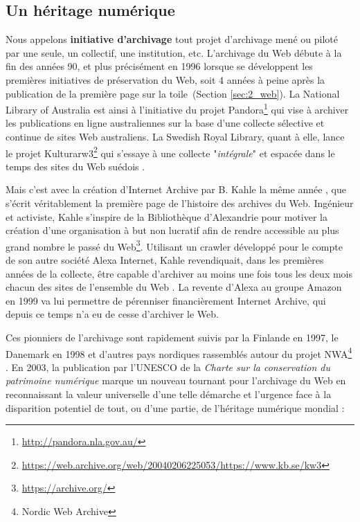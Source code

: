 \documentclass[symmetric,justified,marginals=raggedouter]{tufte-book}
\begin{document}
\subsection{Un héritage numérique}

\noindent Nous appelons \textbf{initiative d'archivage} tout projet d'archivage mené ou piloté par une seule, un collectif, une institution, etc. L'archivage du Web débute à la fin des années 90, et plus précisément en 1996 lorsque se développent les premières initiatives de préservation du Web, soit 4 années à peine après la publication de la première page sur la toile~(Section \ref{sec:2_web}). La National Library of Australia est ainsi à l'initiative du projet Pandora\footnote{\url{http://pandora.nla.gov.au/}} qui vise à archiver les publications en ligne australiennes sur la base d'une collecte sélective et continue de sites Web australiens. La Swedish Royal Library, quant à elle, lance le projet Kulturarw3\footnote{\url{https://web.archive.org/web/20040206225053/https://www.kb.se/kw3}} qui s'essaye à une collecte "\textit{intégrale}" et espacée dans le temps des sites du Web suédois \citep{arvidson_kulturarw3_2000}.

Mais c'est avec la création d'Internet Archive par B. Kahle la même année \citep{kahle_preserving_1997}, que s'écrit véritablement la première page de l'histoire des archives du Web. Ingénieur et activiste, Kahle s'inspire de la Bibliothèque d'Alexandrie pour motiver la création d'une organisation à but non lucratif afin de rendre accessible au plus grand nombre le passé du Web\footnote{\url{https://archive.org/}}. Utilisant un crawler développé pour le compte de son autre société Alexa Internet, Kahle revendiquait, dans les premières années de la collecte, être capable d'archiver au moins une fois tous les deux mois chacun des sites de l'ensemble du Web \citep{mohr_introduction_2004}. La revente d'Alexa au groupe Amazon en 1999 va lui permettre de pérenniser financièrement Internet Archive, qui depuis ce temps n'a eu de cesse d'archiver le Web.

Ces pionniers de l'archivage sont rapidement suivis par la Finlande en 1997, le Danemark en 1998 et d'autres pays nordiques rassemblés autour du projet NWA\footnote{Nordic Web Archive} \citep{hallgrinsson_nordic_2003}. En 2003, la publication par l'UNESCO de la \textit{Charte sur la conservation du patrimoine numérique} \citep{unesco_charter_2003} marque un nouveau tournant pour l'archivage du Web en reconnaissant la valeur universelle d'une telle démarche et l'urgence face à la disparition potentiel de tout, ou d'une partie, de l'héritage numérique mondial : \\
\end{document}

